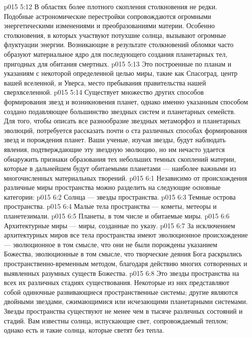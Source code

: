\vs p015 5:12 \bibnobreakspace {} В областях более плотного скопления столкновения не редки. Подобные астрономические перестройки сопровождаются огромными энергетическими изменениями и преобразованиями материи. Особенно столкновения, в которых участвуют потухшие солнца, вызывают огромные флуктуации энергии. Возникающие в результате столкновений обломки часто образуют материальное ядро для последующего создания планетарных тел, пригодных для обитания смертных.
\vs p015 5:13 \bibnobreakspace {} Это построенные по планам и указаниям с некоторой определенной целью миры, такие как Спасоград, центр вашей вселенной, и Уверса, место пребывания правительства нашей сверхвселенной.
\vs p015 5:14 \pc Существует множество других способов формирования звезд и возникновения планет, однако именно указанным способом создано подавляющее большинство звездных систем и планетарных семейств. Для того, чтобы описать все разнообразие звездных метаморфоз и планетарных эволюций, потребуется рассказать почти о ста различных способах формирования звезд и порождения планет. Ваши ученые, изучая звезды, будут наблюдать явления, подтверждающие эту звездную эволюцию, но им нечасто удается обнаружить признаки образования тех небольших темных скоплений материи, которые в дальнейшем будут обитаемыми планетами --- наиболее важными из многочисленных материальных творений.
\vs p015 6:1 Независимо от происхождения различные миры пространства можно разделить на следующие основные категории:
\vs p015 6:2 \bibnobreakspace Солнца --- звезды пространства.
\vs p015 6:3 \bibnobreakspace Темные острова пространства.
\vs p015 6:4 \bibnobreakspace Малые тела пространства --- кометы, метеоры и планетезимали.
\vs p015 6:5 \bibnobreakspace Планеты, в том числе и обитаемые миры.
\vs p015 6:6 \bibnobreakspace Архитектурные миры --- миры, созданные по указу.
\vs p015 6:7 \pc За исключением архитектурных миров все тела пространства имеют эволюционное происхождение --- эволюционное в том смысле, что они не были порождены указанием Божества, эволюционные в том смысле, что творческие деяния Бога раскрылись пространственно\hyp{}временным методом, благодаря действию многих сотворенных и выявленных разумных существ Божества.
\vs p015 6:8 \pc {} Это звезды пространства на всех их различных стадиях существования. Некоторые из них представляют собой одиночные развивающиеся пространственные системы; другие являются двойными звездами, сжимающимися или исчезающими планетарными системами. Звезды пространства существуют не менее чем в тысяче различных состояний и стадий. Вам известны солнца, испускающие свет, сопровождаемый теплом; однако есть и такие солнца, которые светят без тепла.

